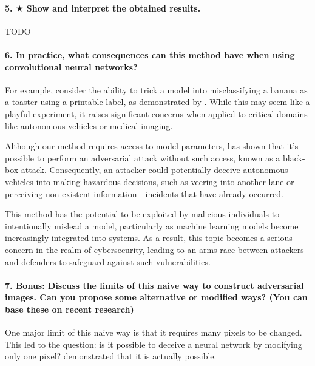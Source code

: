 \paragraph*{5. $ \bigstar $ Show and interpret the obtained results.}

TODO


\paragraph*{6. In practice, what consequences can this method have when using convolutional neural networks?}

For example, consider the ability to trick a model into misclassifying a banana as a toaster using a printable label, as demonstrated by \cite{brown2018adversarial}. While this may seem like a playful experiment, it raises significant concerns when applied to critical domains like autonomous vehicles or medical imaging. 

Although our method requires access to model parameters, \cite{athalye2018synthesizing} has shown that it's possible to perform an adversarial attack without such access, known as a black-box attack. Consequently, an attacker could potentially deceive autonomous vehicles into making hazardous decisions, such as veering into another lane or perceiving non-existent information—incidents that have already occurred. 

This method has the potential to be exploited by malicious individuals to intentionally mislead a model, particularly as machine learning models become increasingly integrated into systems. As a result, this topic becomes a serious concern in the realm of cybersecurity, leading to an arms race between attackers and defenders to safeguard against such vulnerabilities.

\paragraph*{7. \textbf{Bonus:} Discuss the limits of this naive way to construct adversarial images. Can you propose some alternative or modiﬁed ways? (You can base these on recent research)}

One major limit of this naive way is that it requires many pixels to be changed. This led to the question: is it possible to deceive a neural network by modifying only one pixel? \cite{Su_2019} demonstrated that it is actually possible.


